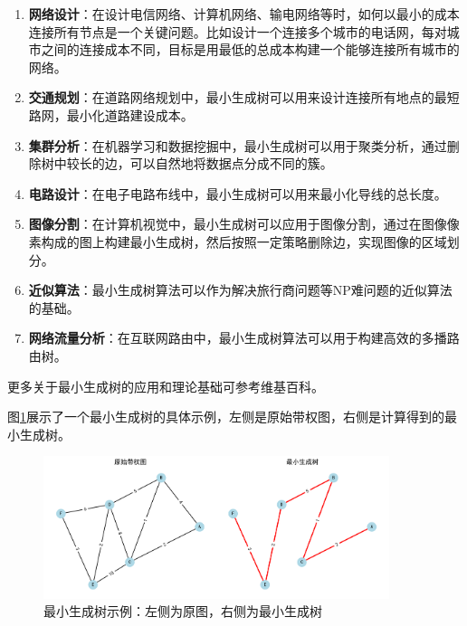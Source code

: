 \documentclass[a4paper,12pt]{ctexart}
\begin{document}
\begin{enumerate}
    \item \textbf{网络设计}：在设计电信网络、计算机网络、输电网络等时，如何以最小的成本连接所有节点是一个关键问题。比如设计一个连接多个城市的电话网，每对城市之间的连接成本不同，目标是用最低的总成本构建一个能够连接所有城市的网络。
    
    \item \textbf{交通规划}：在道路网络规划中，最小生成树可以用来设计连接所有地点的最短路网，最小化道路建设成本。
    
    \item \textbf{集群分析}：在机器学习和数据挖掘中，最小生成树可以用于聚类分析，通过删除树中较长的边，可以自然地将数据点分成不同的簇。
    
    \item \textbf{电路设计}：在电子电路布线中，最小生成树可以用来最小化导线的总长度。
    
    \item \textbf{图像分割}：在计算机视觉中，最小生成树可以应用于图像分割，通过在图像像素构成的图上构建最小生成树，然后按照一定策略删除边，实现图像的区域划分。
    
    \item \textbf{近似算法}：最小生成树算法可以作为解决旅行商问题等NP难问题的近似算法的基础。
    
    \item \textbf{网络流量分析}：在互联网路由中，最小生成树算法可以用于构建高效的多播路由树。
\end{enumerate}

更多关于最小生成树的应用和理论基础可参考维基百科\cite{mst_wiki}。

图\ref{fig:mst_example}展示了一个最小生成树的具体示例，左侧是原始带权图，右侧是计算得到的最小生成树。

\begin{figure}[htbp]
    \centering
    \includegraphics[width=0.9\textwidth]{img/mst_example.png}
    \caption{最小生成树示例：左侧为原图，右侧为最小生成树}
    \label{fig:mst_example}
\end{figure}
\end{document}

